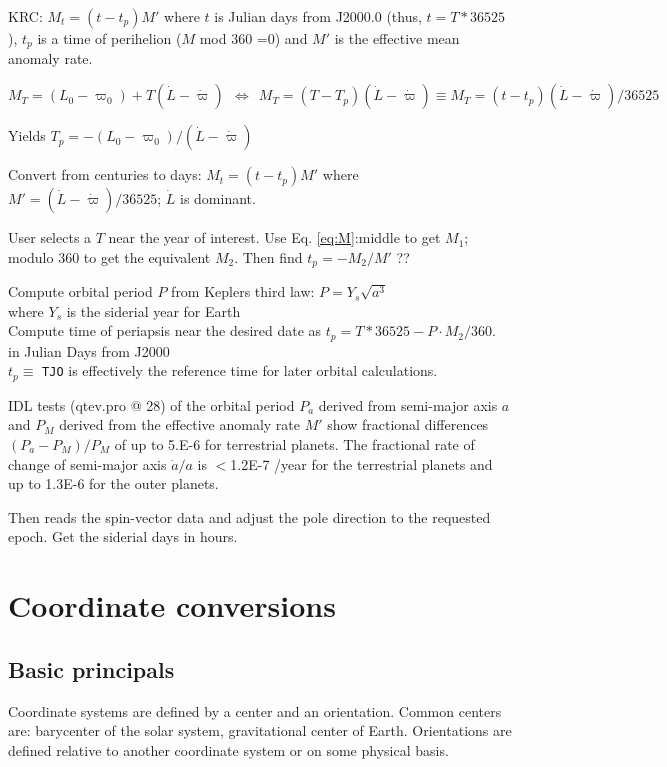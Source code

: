 \documentclass[draft]{article}
\newcommand{\qbn}{\begin{equation}}      %
\newcommand{\qr}[1]{Eq. \ref{eq:#1}}  %
\newcommand{\qi}{\\ \hspace*{2.em}}      %
\newcommand{\nv}{\texttt}  %
\newcommand{\ql}[1]{\label{eq:#1} \end{equation} } %
\begin{document}
KRC: $ M_t= (t-t_p)M'$ where $t$ is Julian days from J2000.0 (thus, $t=T*36525$), $t_p$ is a time of perihelion ($M$ mod 360 =0) and $M'$ is the effective mean anomaly rate.

\qbn  M_T=\left( L_0 - \varpi_0 \right) +T\left( \dot{L}- \dot{\varpi} \right) 
\ \  \Leftrightarrow  \ \  M_T= \left(T-T_p  \right)  \left( \dot{L}- \dot{\varpi}  \right) \equiv  M_T= \left(t-t_p  \right)  \left( \dot{L}- \dot{\varpi}  \right)/36525 \ql{M}

Yields $ T_p = -\left( L_0 - \varpi_0 \right)  /   \left( \dot{L}- \dot{\varpi}  \right) $

Convert from centuries to days:
$ M_t=  \left(t-t_p  \right) M'  $ where $M'=  \left( \dot{L}- \dot{\varpi}  \right)/36525 $; $ \dot{L}$ is dominant. 
 

User selects a $T$ near the year of interest. Use \qr{M}:middle to get $M_1$; modulo 360 to get the equivalent $M_2$. Then find $t_p = -M_2/M' $ ??


Compute orbital period $P$ from Keplers third law: $P=Y_s \sqrt{a^3}$ 
\qi where $Y_s$ is the siderial year for Earth
\\ Compute time of periapsis near the desired date as $t_p= T*36525 -P \cdot M_2/360.$ in Julian Days from J2000
\qi $t_p \equiv$ \nv{TJO} is effectively the reference time for later orbital calculations.


IDL tests (qtev.pro @ 28) of the orbital period $P_a$ derived from semi-major axis $a$ and $P_M$
derived from the effective anomaly rate $M'$ show fractional differences
$(P_a-P_M)/P_M$ of up to 5.E-6 for terrestrial planets.   The fractional rate of change of semi-major axis $\dot{a}/a$ is
$<$1.2E-7 /year for the terrestrial planets and up to 1.3E-6 for the outer
planets.

Then reads the spin-vector data and adjust the pole direction to the requested epoch. Get the siderial days in hours.
\section{Coordinate conversions}
\subsection {Basic principals}

 Coordinate systems are defined by a center and an orientation. Common centers
 are: barycenter of the solar system, gravitational center of
 Earth. Orientations are defined relative to another coordinate system or on
 some physical basis.
\end{document}
